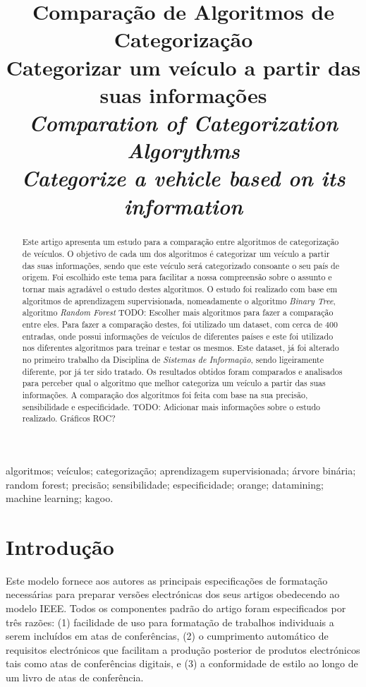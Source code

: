 \documentclass[conference]{IEEEtran}
\title{Comparação de Algoritmos de Categorização \\ \large Categorizar um veículo a partir das suas informações \\
\textit{Comparation of Categorization Algorythms \\ \large Categorize a vehicle based on its information}}
\author{
\IEEEauthorblockN{Martinho Caeiro - 23917 || Paulo Abade - 23919}
\IEEEauthorblockA{
    Instituto Politécnico de Beja\\
    Escola Superior de Tecnologia e Gestão\\
    Beja, Portugal\\
    23917@stu.ipbeja.pt || 23919@stu.ipbeja.pt
}
}
\begin{document}
\maketitle

\begin{abstract}
Este artigo apresenta um estudo para a comparação entre algoritmos de categorização de veículos. O objetivo de cada um dos 
algoritmos é categorizar um veículo a partir das suas informações, sendo que este veículo será categorizado consoante o seu 
país de origem. Foi escolhido este tema para facilitar a nossa compreensão sobre o assunto e tornar mais agradável o estudo
destes algoritmos. O estudo foi realizado com base em algoritmos de aprendizagem supervisionada, nomeadamente o algoritmo
\textit{Binary Tree}, algoritmo \textit{Random Forest} TODO: Escolher mais algoritmos para fazer a comparação entre eles. 
Para fazer a comparação destes, foi utilizado um dataset, com cerca de 400 entradas, onde possui informações de veículos de 
diferentes países e este foi utilizado nos diferentes algoritmos para treinar e testar os mesmos. Este dataset, já foi alterado 
no primeiro trabalho da Disciplina de \textit{Sistemas de Informação}, sendo ligeiramente diferente, por já ter sido tratado. 
Os resultados obtidos foram comparados e analisados para perceber qual o algoritmo que melhor categoriza um veículo a partir das 
suas informações. A comparação dos algoritmos foi feita com base na sua precisão, sensibilidade e especificidade. TODO: Adicionar 
mais informações sobre o estudo realizado. Gráficos ROC?
\end{abstract}

\begin{IEEEkeywords}
algoritmos; veículos; categorização; aprendizagem supervisionada; árvore binária; random forest; precisão; sensibilidade; especificidade;
orange; datamining; machine learning; kagoo.
\end{IEEEkeywords}

\section{Introdução}
Este modelo fornece aos autores as principais especificações de formatação necessárias para preparar versões electrónicas dos 
seus artigos obedecendo ao modelo IEEE. Todos os componentes padrão do artigo foram especificados por três razões: (1) facilidade 
de uso para formatação de trabalhos individuais a serem incluídos em atas de conferências, (2) o cumprimento automático de 
requisitos electrónicos que facilitam a produção posterior de produtos electrónicos tais como atas de conferências digitais, 
e (3) a conformidade de estilo ao longo de um livro de atas de conferência.
\end{document}
